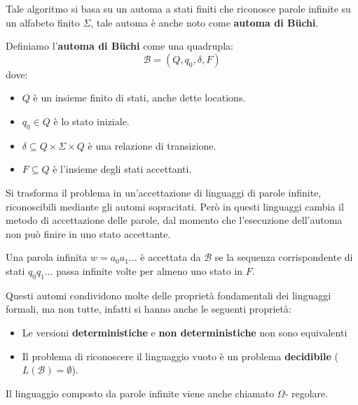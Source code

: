 Tale algoritmo si basa su un automa a stati finiti che riconosce parole infinite
su un alfabeto finito $\Sigma$, tale automa è anche noto come \textbf{automa di
    Büchi}.
\begin{definizione}
    Definiamo l'\textbf{automa di Büchi} come una quadrupla:
    \begin{equation}
        \mathcal{B} = (Q, q_0, \delta, F)
    \end{equation}
    dove:
    \begin{itemize}
        \item $Q$ è un insieme finito di stati, anche dette locations.
        \item $q_0 \in Q$ è lo stato iniziale.
        \item $\delta \subseteq Q \times \Sigma \times Q$ è una relazione di
              transizione.
        \item $F \subseteq Q$ è l'insieme degli stati accettanti.
    \end{itemize}
\end{definizione}
Si trasforma il problema in un'accettazione di linguaggi di parole infinite,
riconoscibili mediante gli automi sopracitati. Però in questi linguaggi cambia il
metodo di accettazione delle parole, dal momento che l'esecuzione dell'automa non
può finire in uno stato accettante.
\begin{definizione}
    Una parola infinita $w = a_0a_1\dots$ è accettata da $\mathcal{B}$ se la
    sequenza corrispondente di stati $q_0q_1\dots$ passa infinite volte per
    almeno uno stato in $F$.
\end{definizione}
Questi automi condividono molte delle proprietà fondamentali dei linguaggi formali,
ma non tutte, infatti si hanno anche le seguenti proprietà:
\begin{itemize}
    \item Le versioni \textbf{deterministiche} e \textbf{non deterministiche}
          non sono equivalenti
    \item Il problema di riconoscere il linguaggio vuoto è un problema
          \textbf{decidibile} ($L(\mathcal{B}) = \emptyset$).
\end{itemize}

\begin{nota}
    Il linguaggio composto da parole infinite viene anche chiamato $\Omega$-
    regolare.
\end{nota}

